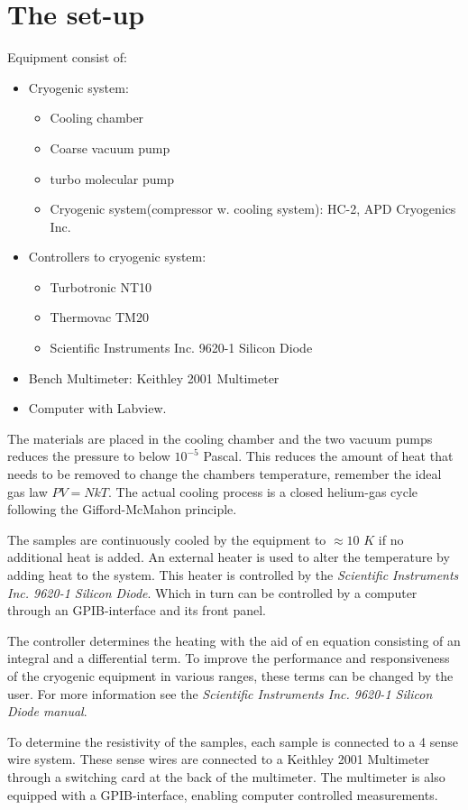 \documentclass[a4paper,12pt]{article}
\begin{document}
\section{The set-up}
Equipment consist of:
\begin{itemize}
\item Cryogenic system:
\begin{itemize}
\item Cooling chamber
\item Coarse vacuum pump
\item turbo molecular pump
\item Cryogenic system(compressor w. cooling system): HC-2, APD Cryogenics Inc.
\end{itemize}
\item Controllers to cryogenic system: 
\begin{itemize}
\item Turbotronic NT10
\item Thermovac TM20
\item Scientific Instruments Inc. 9620-1 Silicon Diode
\end{itemize} 
\item Bench Multimeter: Keithley 2001 Multimeter
\item Computer with Labview.
\end{itemize}

The materials are placed in the cooling chamber and the two vacuum pumps reduces the pressure to below $10^{-5}$ Pascal. This reduces the amount of heat that needs to be removed to change the chambers temperature, remember the ideal gas law $PV=NkT$. The actual cooling process is a closed helium-gas cycle following the Gifford-McMahon principle.

The samples are continuously cooled by the equipment to $\approx 10$ $K$ if no additional heat is added. An external heater is used to alter the temperature by adding heat to the system. This heater is controlled by the \emph{Scientific Instruments Inc. 9620-1 Silicon Diode}. Which in turn can be controlled by a computer through an GPIB-interface and its front panel. 

The controller determines the heating with the aid of en equation consisting of an integral and a differential term. To improve the performance and responsiveness of the cryogenic equipment in various ranges, these terms can be changed by the user. For more information see the \emph{Scientific Instruments Inc. 9620-1 Silicon Diode manual}.

To determine the resistivity of the samples, each sample is connected to a 4 sense wire system. These sense wires are connected to a Keithley 2001 Multimeter through a switching card at the back of the multimeter. The multimeter is also equipped with a GPIB-interface, enabling computer controlled measurements. 
\end{document}
